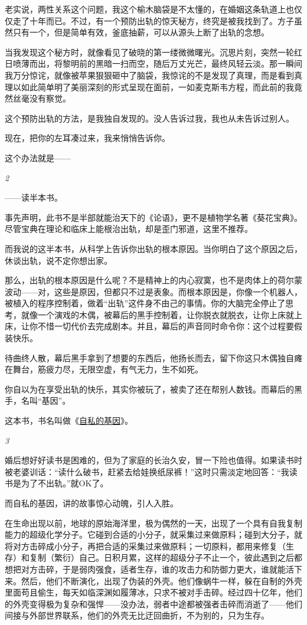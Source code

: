 \documentclass[twoside,openright,headings=optiontohead]{ctexbook} %
\begin{document}
{老实说，两性关系这个问题，我这个榆木脑袋是不太懂的，在婚姻这条轨道上也仅仅走了十年而已。不过，有一个预防出轨的惊天秘方，终究是被我找到了。方子虽然只有一个，但是简单有效，釜底抽薪，可以从源头上断了出轨的念想。

当我发现这个秘方时，就像看见了破晓的第一缕微微曙光。沉思片刻，突然一轮红日喷薄而出，将黎明前的黑暗一扫而空，随后万丈光芒，最终风轻云淡。那一瞬间我万分惊诧，就像被苹果狠狠砸中了脑袋，我惊诧的不是发现了真理，而是看到真理以如此简单明了美丽深刻的形式呈现在面前，一如麦克斯韦方程，而此前的我竟然丝毫没有察觉。

这个预防出轨的方法，是我独自发现的。没人告诉过我，我也从未告诉过别人。

现在，把你的左耳凑过来，我来悄悄告诉你。

这个办法就是------

\emph{2}

------读半本书。

事先声明，此书不是半部就能治天下的《论语》，更不是植物学名著《葵花宝典》。尽管宝典在理论和临床上能根治出轨，却是歪门邪道，这里不推荐。

而我说的这半本书，从科学上告诉你出轨的根本原因。当你明白了这个原因之后，休谈出轨，说不定你想出家。

那么，出轨的根本原因是什么呢？不是精神上的内心寂寞，也不是肉体上的荷尔蒙波动------对，这些是原因，但都只不过是表象。而根本原因是，你像一个机器人，被植入的程序控制着，做着``出轨''这件身不由己的事情。你的大脑完全停止了思考，就像一个演戏的木偶，被幕后的黑手控制着，让你脱衣就脱衣，让你上床就上床，让你不惜一切代价去完成剧本。并且，幕后的声音同时命令你：这个过程要假装快乐。

待曲终人散，幕后黑手拿到了想要的东西后，他扬长而去，留下你这只木偶独自瘫在舞台，筋疲力尽，无限空虚，有气无力，生不如死。

你自以为在享受出轨的快乐，其实你被玩了，被卖了还在帮别人数钱。而幕后的黑手，名叫``基因''。

这本书，书名叫做《\href{http://dapengde.com/archives/18032}{自私的基因}》。

\emph{3}

婚后想好好读书是困难的，但为了家庭的长治久安，冒一下险也值得。如果读书时被老婆训话：``读什么破书，赶紧去给娃换纸尿裤！''这时只需淡定地回答：``我读书是为了不出轨。''就OK了。

而自私的基因，讲的故事惊心动魄，引人入胜。

在生命出现以前，地球的原始海洋里，极为偶然的一天，出现了一个具有自我复制能力的超级化学分子。它碰到合适的小分子，就采集过来做原料；碰到大分子，就将对方击碎成小分子，再把合适的采集过来做原料；一切原料，都用来修复（生存）和复制（繁衍）自己。日积月累，这样的超级分子不止一个，彼此遇到之后都想把对方击碎，于是弱肉强食，适者生存，谁的攻击力和防御力更大，谁就能活下来。然后，他们不断演化，出现了伪装的外壳。他们像蜗牛一样，躲在自制的外壳里面苟且偷生，每天如临深渊如履薄冰，只求不被对手击碎。经过四十亿年，他们的外壳变得极为复杂和强悍------没办法，弱者中途都被强者击碎而消逝了------他们间接与外部世界联系，他们的外壳无比迂回曲折，不为别的，只为生存。

}
\end{document}
